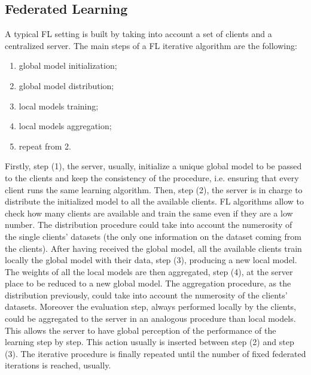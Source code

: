 \documentclass{article} %
\begin{document}
\subsection{Federated Learning}
A typical FL setting 
is built by taking into account a set of clients and a centralized server.
The main steps of a FL iterative algorithm are the following:
\begin{enumerate}
    \item global model initialization;
    \item global model distribution;
    \item local models training;
    \item local models aggregation;
    \item repeat from 2.
\end{enumerate}
Firstly, step (1), the server, usually, initialize a unique global model to be 
passed to the clients and keep the consistency of the procedure, i.e. ensuring 
that every client runs the same learning algorithm.
Then, step (2), the server is in charge to distribute the initialized model to 
all the available clients. FL algorithms allow to check how many clients are 
available and train the same even if they are a low number. The distribution 
procedure could take into account the numerosity of the single clients' datasets 
(the only one information on the dataset coming from the clients).
After having received the global model, all the available clients train locally
the global model with their data, step (3), producing a new local model.
The weights of all the local models are then aggregated, step (4), at the server 
place to be reduced to a new global model. The aggregation procedure, as the 
distribution previously, could take into account the numerosity of the clients' 
datasets.
Moreover the evaluation step, always performed locally by the clients, could be
aggregated to the server in an analogous procedure than local models. This allows
the server to have global perception of the performance of the learning step by 
step. This action usually is inserted between step (2) and step (3).
The iterative procedure is finally repeated until the number of fixed federated 
iterations is reached, usually.
\end{document}
